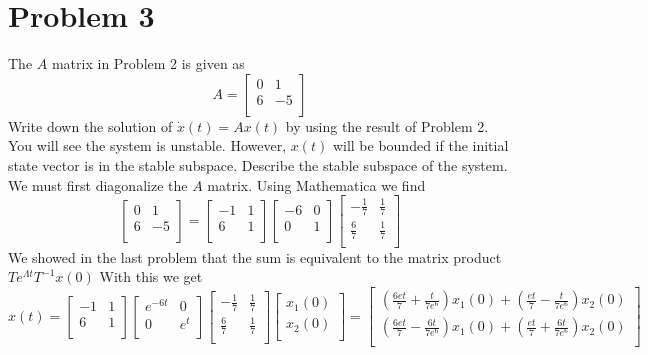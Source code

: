 \documentclass{article}
\begin{document}
\newpage
\section*{Problem 3}
The $A$ matrix in Problem 2 is given as
$$ A =
\begin{bmatrix}
0 & 1 \\
6 & -5 \\
\end{bmatrix}
$$
Write down the solution of $\dot{x}(t) = Ax(t)$ by using the result of Problem 2.
You will see the system is unstable.
However, $x(t)$ will be bounded if the initial state vector is in the stable subspace.
Describe the stable subspace of the system.
\newline
We must first diagonalize the $A$ matrix.
Using Mathematica we find
$$
\begin{bmatrix}
0 & 1 \\
6 & -5 \\
\end{bmatrix}
=
\begin{bmatrix}
 -1 & 1 \\
  6 & 1 \\
\end{bmatrix}
\begin{bmatrix}
 -6 & 0 \\
  0 & 1 \\
\end{bmatrix}
\begin{bmatrix}
 -\frac{1}{7} & \frac{1}{7} \\
  \frac{6}{7} & \frac{1}{7} \\
\end{bmatrix}
$$
We showed in the last problem that the sum is equivalent to the matrix product
$ Te^{\Lambda t}T^{-1} x(0)$
With this we get
$$
x(t) =
\begin{bmatrix}
 -1 & 1 \\
  6 & 1 \\
\end{bmatrix}
\begin{bmatrix}
 e^{-6 t} & 0 \\
  0 & e^t \\
\end{bmatrix}
\begin{bmatrix}
 -\frac{1}{7} & \frac{1}{7} \\
  \frac{6}{7} & \frac{1}{7} \\
\end{bmatrix}
\begin{bmatrix}
x_1(0) \\
x_2(0) \\
\end{bmatrix}
=
\begin{bmatrix}
\left(\frac{6 e t}{7}+\frac{t}{7 e^6}\right) x_1(0)+\left(\frac{e t}{7}-\frac{t}{7 e^6}\right) x_2(0) \\
\left(\frac{6 e t}{7}-\frac{6 t}{7 e^6}\right) x_1(0)+\left(\frac{e t}{7}+\frac{6 t}{7 e^6}\right) x_2(0) \\
\end{bmatrix}
$$
\end{document}
